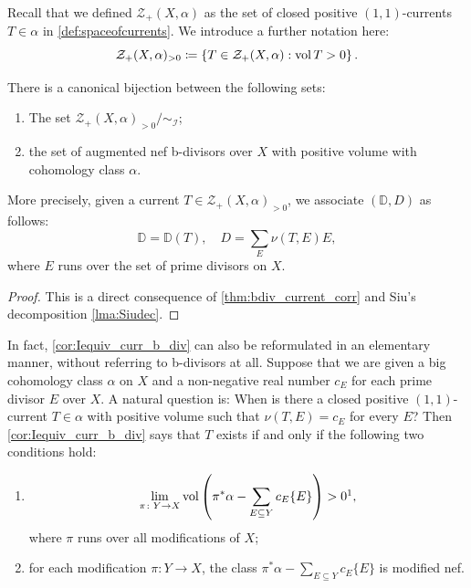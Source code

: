 Recall that we defined $\mathcal{Z}_+(X,\alpha)$ as the set of closed positive $(1,1)$-currents $T\in \alpha$ in \cref{def:spaceofcurrents}. We introduce a further notation here:
\[
\mathcal{Z}_+(X,\alpha)_{>0}\coloneqq \left\{T\in \mathcal{Z}_+(X,\alpha): \operatorname{vol} T>0\right\}.
\]

\begin{corollary}\label{cor:Iequiv_curr_b_div}
    There is a canonical bijection between the following sets:
    \begin{enumerate}
        \item\label{itm:cor:Iequiv_curr_b_div:1} The set $\mathcal{Z}_+(X,\alpha)_{>0}/\sim_{\mathcal{I}}$;
        \item\label{itm:cor:Iequiv_curr_b_div:2} the set of augmented nef b-divisors over $X$ with positive volume with cohomology class $\alpha$.
    \end{enumerate}
\end{corollary}
More precisely, given a current $T\in \mathcal{Z}_+(X,\alpha)_{>0}$, we associate $(\mathbb{D},D)$ as follows:
\[
\mathbb{D}=\mathbb{D}(T),\quad D=\sum_E \nu(T,E)E,
\]
where $E$ runs over the set of prime divisors on $X$.
\begin{proof}
    This is a direct consequence of \cref{thm:bdiv_current_corr} and Siu's decomposition \cref{lma:Siudec}.
\end{proof}

In fact, \cref{cor:Iequiv_curr_b_div} can also be reformulated in an elementary manner, without referring to b-divisors at all. Suppose that we are given a big cohomology class $\alpha$ on $X$ and a non-negative real number $c_E$ for each prime divisor $E$ over $X$. A natural question is: When is there a closed positive $(1,1)$-current $T\in \alpha$ with positive volume such that $\nu(T,E)=c_E$ for every $E$? Then \cref{cor:Iequiv_curr_b_div} says that $T$ exists if and only if the following two conditions hold:
\begin{enumerate}
    \item\label{itm:chapter-bdiv:L472:1}
    \[
    \lim_{\pi\colon Y\rightarrow X} \vol\left( \pi^*\alpha-\sum_{E\subseteq Y} c_E \{E\} \right)>0\footnotemark,
    \]
    where $\pi$ runs over all modifications of $X$;
    \item\label{itm:chapter-bdiv:L472:2} for each modification $\pi\colon Y\rightarrow X$, the class $ \pi^*\alpha-\sum_{E\subseteq Y} c_E \{E\}$ is modified nef.
\end{enumerate}




